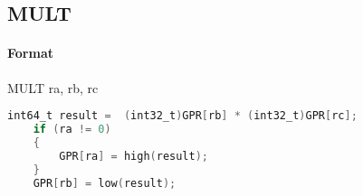 \subsection{MULT}


\paragraph{Format} MULT ra, rb, rc

\begin{lstlisting}[language=C]
    int64_t result =  (int32_t)GPR[rb] * (int32_t)GPR[rc];
    if (ra != 0)
    {
        GPR[ra] = high(result);
    }
    GPR[rb] = low(result);
\end{lstlisting}